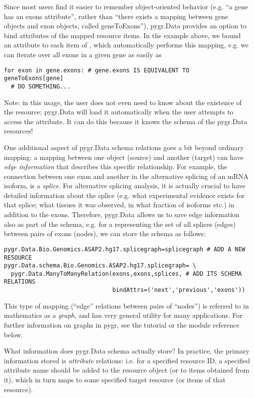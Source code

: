 \documentclass{howto}
\begin{document}
Since most users find it easier to remember object-oriented behavior
(e.g. ``a gene has an exons attribute'', rather than ``there exists a 
mapping between gene objects and exon objects, called geneToExons''),
pygr.Data provides an option to bind attributes of the mapped
resource items.  In the example above, we bound an  attribute
to each item of , which automatically performs this mapping,
e.g. we can iterate over all exons in a given gene as easily as
\begin{verbatim}
for exon in gene.exons: # gene.exons IS EQUIVALENT TO geneToExons[gene]
  # DO SOMETHING...
\end{verbatim}
Note: in this usage, the user does not even need to know about the 
existence of the  resource; pygr.Data will load it
automatically when the user attempts to access the 
attribute.  It can do this because it knows the schema of the pygr.Data
resources!

One additional aspect of pygr.Data schema relations goes a bit beyond
ordinary mapping: a mapping between one object (source) and another
(target) can have {\em edge information} that describes this specific
relationship.  For example, the connection
between one exon and another in the alternative splicing of an mRNA
isoform, is a {\em splice}.  For alternative splicing analysis, it is
actually crucial to have detailed information about the splice (e.g.
what experimental evidence exists for that splice; what tissues it was
observed, in what fraction of isoforms etc.) in addition to the exons.
Therefore, pygr.Data allows us to save edge information also as part 
of the schema, e.g. for a  representing the set of
all splices (edges) between pairs of exons (nodes), we can
store the schema as follows:
\begin{verbatim}
pygr.Data.Bio.Genomics.ASAP2.hg17.splicegraph=splicegraph # ADD A NEW RESOURCE
pygr.Data.schema.Bio.Genomics.ASAP2.hg17.splicegraph= \
  pygr.Data.ManyToManyRelation(exons,exons,splices, # ADD ITS SCHEMA RELATIONS
                               bindAttrs=('next','previous','exons'))
\end{verbatim}
This type of mapping (``edge'' relations between pairs of ``nodes'')
is referred to in mathematics as a {\em graph}, and has very general
utility for many applications.  For further information on graphs in 
pygr, see the tutorial or the \module{mapping} module reference below.

What information does pygr.Data schema actually store?  In practice,
the primary information stored is {\em attribute} relations: 
i.e. for a specified resource ID, a specified attribute name
should be added to the resource object (or to items obtained
from it), which in turn maps to some specified target resource
(or items of that resource).  
\end{document}
